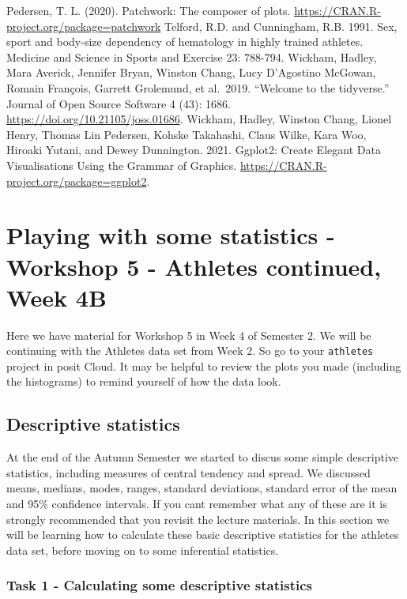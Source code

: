 \documentclass[
]{book}
\begin{document}
Pedersen, T. L. (2020). Patchwork: The composer of plots. \url{https://CRAN.R-project.org/package=patchwork}
Telford, R.D. and Cunningham, R.B. 1991. Sex, sport and body-size dependency of hematology in highly trained athletes. Medicine and Science in Sports and Exercise 23: 788-794.
Wickham, Hadley, Mara Averick, Jennifer Bryan, Winston Chang, Lucy D'Agostino McGowan, Romain François, Garrett Grolemund, et al.~2019. ``Welcome to the tidyverse.'' Journal of Open Source Software 4 (43): 1686. \url{https://doi.org/10.21105/joss.01686}.
Wickham, Hadley, Winston Chang, Lionel Henry, Thomas Lin Pedersen, Kohske Takahashi, Claus Wilke, Kara Woo, Hiroaki Yutani, and Dewey Dunnington. 2021. Ggplot2: Create Elegant Data Visualisations Using the Grammar of Graphics. \url{https://CRAN.R-project.org/package=ggplot2}.

\hypertarget{stats}{%
\chapter{Playing with some statistics - Workshop 5 - Athletes continued, Week 4B}\label{stats}}

Here we have material for Workshop 5 in Week 4 of Semester 2. We will be continuing with the Athletes data set from Week 2. So go to your \texttt{athletes} project in posit Cloud. It may be helpful to review the plots you made (including the histograms) to remind yourself of how the data look.

\hypertarget{descriptive-statistics}{%
\section{Descriptive statistics}\label{descriptive-statistics}}

At the end of the Autumn Semester we started to discus some simple descriptive statistics, including measures of central tendency and spread. We discussed means, medians, modes, ranges, standard deviations, standard error of the mean and 95\% confidence intervals. If you cant remember what any of these are it is strongly recommended that you revisit the lecture materials. In this section we will be learning how to calculate these basic descriptive statistics for the athletes data set, before moving on to some inferential statistics.

\hypertarget{task-1---calculating-some-descriptive-statistics}{%
\subsection{Task 1 - Calculating some descriptive statistics}\label{task-1---calculating-some-descriptive-statistics}}
\end{document}
